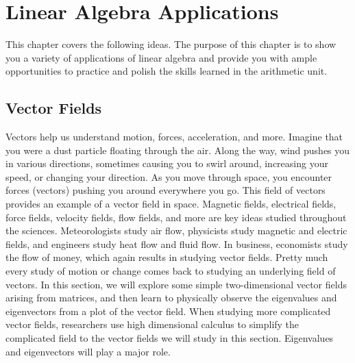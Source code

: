 
\chapter{Linear Algebra Applications}

This chapter covers the following ideas.  The purpose of this chapter
is to show you a variety of applications of linear algebra and provide you with ample opportunities to practice and polish the skills learned in the arithmetic unit.  






\section{Vector Fields}



Vectors help us understand motion, forces, acceleration, and more. Imagine that you were a dust particle floating through the air.  Along the way, wind pushes you in various directions, sometimes causing you to swirl around, increasing your speed, or changing your direction. As you move through space, you encounter forces (vectors) pushing you around everywhere you go. This field of vectors provides an example of a vector field in space.  Magnetic fields, electrical fields, force fields, velocity fields, flow fields, and more are key ideas studied throughout the sciences. Meteorologists study air flow, physicists study magnetic and electric fields, and engineers study heat flow and fluid flow. In business, economists study the flow of money, which again results in studying vector fields. Pretty much every study of motion or change comes back to studying an underlying field of vectors.  In this section, we will explore some simple two-dimensional vector fields arising from matrices, and then learn to physically observe the eigenvalues and eigenvectors from a plot of the vector field.  When studying more complicated vector fields, researchers use high dimensional calculus to simplify the complicated field to the vector fields we will study in this section. Eigenvalues and eigenvectors will play a major role.

